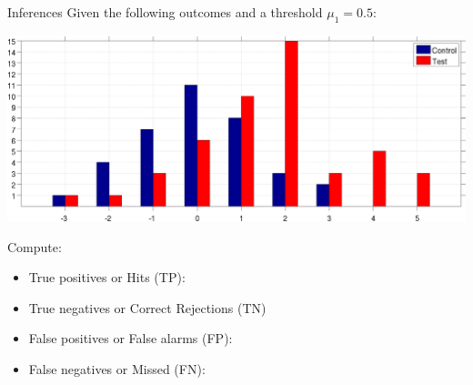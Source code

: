 \documentclass{beamer}
\begin{document}
%


\begin{frame}{Inferences}
  Given the following outcomes and a threshold $\mu_{1} = 0.5$:

  \begin{center}
    \includegraphics[scale=0.055]{./Control_Test.jpg}
  \end{center}

  Compute:
  \begin{itemize}
    \item True positives or Hits (TP):
    \item True negatives or Correct Rejections (TN)
    \item False positives or False alarms (FP):
    \item False negatives or Missed (FN):
  \end{itemize}
\end{frame}
\end{document}
